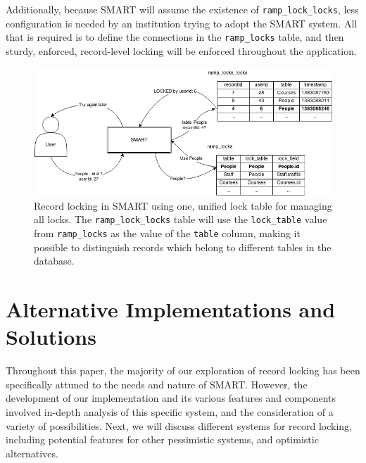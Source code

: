 \documentclass[12pt]{article}
\newcommand{\code}[1]{\texttt{#1}}
\begin{document}
Additionally, because SMART will assume the existence of \code{ramp\_lock\_locks}, less configuration is needed by an institution trying to adopt the SMART system. All that is required is to define the connections in the \code{ramp\_locks} table, and then sturdy, enforced, record-level locking will be enforced throughout the application.

\begin{center}
\begin{figure}[h]
    \centering
    \centerline{\includegraphics[width=7in]{diagrams/UnifiedLockDesign.png}}
    \begin{spacing}{1.0}\caption{Record locking in SMART using one, unified lock table for managing all locks. The \code{ramp\_lock\_locks} table will use the \code{lock\_table} value from \code{ramp\_locks} as the value of the \code{table} column, making it possible to distinguish records which belong to different tables in the database.}\end{spacing}
\end{figure}
\end{center}

\newpage
\section{Alternative Implementations and Solutions}

Throughout this paper, the majority of our exploration of record locking has been specifically attuned to the needs and nature of SMART. However, the development of our implementation and its various features and components involved in-depth analysis of this specific system, and the consideration of a variety of possibilities. Next, we will discuss different systems for record locking, including potential features for other pessimistic systems, and optimistic alternatives.
\end{document}
